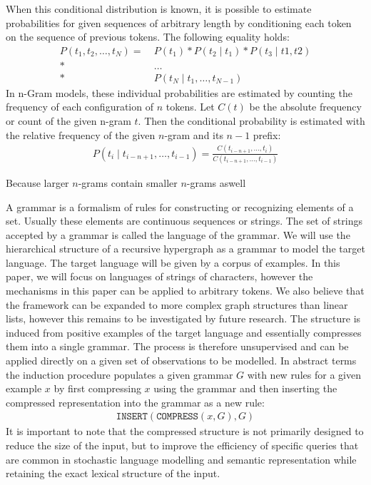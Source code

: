 When this conditional distribution is known, it is possible to estimate probabilities for given sequences of arbitrary length by conditioning each token on the sequence of previous tokens. The following equality holds:
\begin{align*}
    P(t_1, t_2, \ldots, t_N) =\  &P(t_1) * P(t_2  \mid t_1) * P(t_3 \mid t1, t2)\\
                          *\  &\ldots\\
                          *\  &P(t_N \mid t_1, \ldots, t_{N-1})
\end{align*}
In n-Gram models, these individual probabilities are estimated by counting the frequency of each configuration of $n$ tokens. Let $C(t)$ be the absolute frequency or count of the given n-gram $t$. Then the conditional probability is estimated with the relative frequency of the given $n$-gram and its $n-1$ prefix:
\begin{align*}
    P(t_i \mid t_{i-n+1}, \ldots, t_{i-1}) = \frac{C(t_{i-n+1}, \ldots, t_i)}{C(t_{i-n+1}, \ldots, t_{i-1})}
\end{align*}

Because larger $n$-grams contain smaller $n$-grams aswell

A grammar is a formalism of rules for constructing or recognizing elements of a set. Usually these elements are continuous sequences or strings. The set of strings accepted by a grammar is called the language of the grammar. We will use the hierarchical structure of a recursive hypergraph as a grammar to model the target language. The target language will be given by a corpus of examples. In this paper, we will focus on languages of strings of characters, however the mechanisms in this paper can be applied to arbitrary tokens. We also believe that the framework can be expanded to more complex graph structures than linear lists, however this remains to be investigated by future research.
The structure is induced from positive examples of the target language and essentially compresses them into a single grammar. The process is therefore unsupervised and can be applied directly on a given set of observations to be modelled.
In abstract terms the induction procedure populates a given grammar $G$ with new rules for a given example $x$ by first compressing $x$ using the grammar and then inserting the compressed representation into the grammar as a new rule:
\begin{align*}
    \texttt{INSERT}(\texttt{COMPRESS}(x, G), G)
\end{align*}
It is important to note that the compressed structure is not primarily designed to reduce the size of the input, but to improve the efficiency of specific queries that are common in stochastic language modelling and semantic representation while retaining the exact lexical structure of the input.


